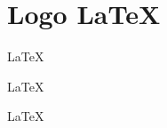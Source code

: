 \chapter{Logo LaTeX}

\thispagestyle{empty} 

\vfill

\begin{center}
{\fontsize{50pt}{800pt}\selectfont \LaTeX}\
\end{center}

\vfill

\begin{center}
{\color{cinza_UnB}\fontsize{50pt}{800pt}\selectfont \LaTeX}\
\end{center}

\vfill

\begin{center}
{\color{verde_UnB}\fontsize{50pt}{800pt}\selectfont \LaTeX}\
\end{center}

\vfill